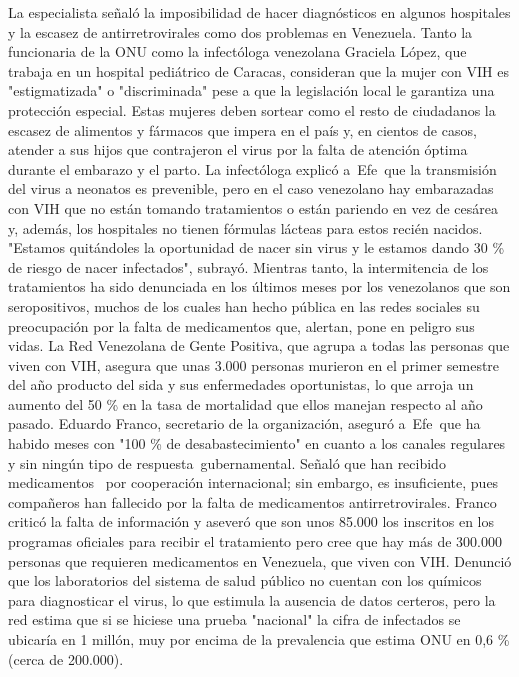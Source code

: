 \documentclass{article}%
\begin{document}
\newline%
%
La especialista señaló la imposibilidad de hacer diagnósticos en algunos hospitales y la escasez de antirretrovirales como dos problemas en Venezuela.%
\newline%
%
Tanto la funcionaria de la ONU como la infectóloga venezolana Graciela López, que trabaja en un hospital pediátrico de Caracas, consideran que la mujer con VIH es "estigmatizada" o "discriminada" pese a que la legislación local le garantiza una protección especial.%
\newline%
%
Estas mujeres deben sortear como el resto de ciudadanos la escasez de alimentos y fármacos que impera en el país y, en cientos de casos, atender a sus hijos que contrajeron el virus por la falta de atención óptima durante el embarazo y el parto.%
\newline%
%
La infectóloga explicó a~Efe~que la transmisión del virus a neonatos es prevenible, pero en el caso venezolano hay embarazadas con VIH que no están tomando tratamientos o están pariendo en vez de cesárea y, además, los hospitales no tienen fórmulas lácteas para estos recién nacidos.%
\newline%
%
"Estamos quitándoles la oportunidad de nacer sin virus y le estamos dando 30 \% de riesgo de nacer infectados", subrayó.%
\newline%
%
Mientras tanto, la intermitencia de los tratamientos ha sido denunciada en los últimos meses por los venezolanos que son seropositivos, muchos de los cuales han hecho pública en las redes sociales su preocupación por la falta de medicamentos que, alertan, pone en peligro sus vidas.%
\newline%
%
La Red Venezolana de Gente Positiva, que agrupa a todas las personas que viven con VIH, asegura que unas 3.000 personas murieron en el primer semestre del año producto del sida y sus enfermedades oportunistas, lo que arroja un aumento del 50 \% en la tasa de mortalidad que ellos manejan respecto al año pasado.%
\newline%
%
Eduardo Franco, secretario de la organización, aseguró a~Efe~que ha habido meses con "100 \% de desabastecimiento" en cuanto a los canales regulares y sin ningún tipo de respuesta~gubernamental.%
\newline%
%
Señaló que han recibido medicamentos~ por cooperación internacional; sin embargo, es insuficiente, pues compañeros han fallecido por la falta de medicamentos antirretrovirales.%
\newline%
%
Franco criticó la falta de información y aseveró que son unos 85.000 los inscritos en los programas oficiales para recibir el tratamiento pero cree que hay más de 300.000 personas que requieren medicamentos en Venezuela, que viven con VIH.%
\newline%
%
Denunció que los laboratorios del sistema de salud público no cuentan con los químicos para diagnosticar el virus, lo que estimula la ausencia de datos certeros, pero la red estima que si se hiciese una prueba "nacional" la cifra de infectados se ubicaría en 1 millón, muy por encima de la prevalencia que estima ONU en 0,6 \% (cerca de 200.000).%
\newline%
%
\end{document}
